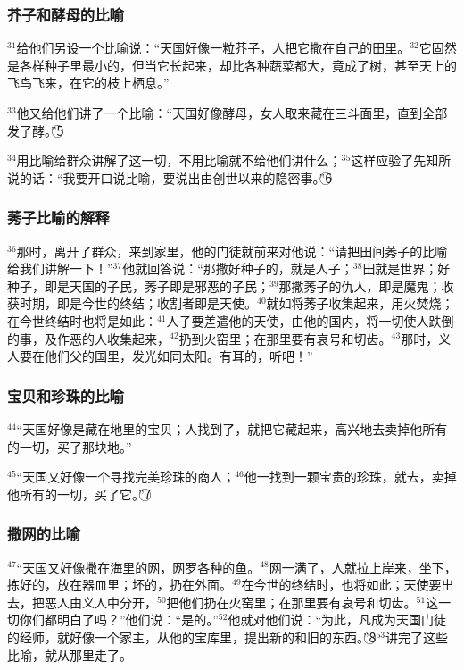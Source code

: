 \subsubsection{芥子和酵母的比喻}
$^{31}$\UL[耶稣]给他们另设一个比喻说：“天国好像一粒芥子，人把它撒在自己的田里。$^{32}$它固然是各样种子里最小的，但当它长起来，却比各种蔬菜都大，竟成了树，甚至天上的飞鸟飞来，在它的枝上栖息。”

$^{33}$他又给他们讲了一个比喻：“天国好像酵母，女人取来藏在三斗面里，直到全部发了酵。”\textcircled{5}

$^{34}$\UL[耶稣]用比喻给群众讲解了这一切，不用比喻就不给他们讲什么；$^{35}$这样应验了先知所说的话：“我要开口说比喻，要说出由创世以来的隐密事。”\textcircled{6}


\subsubsection{莠子比喻的解释}
$^{36}$那时，\UL[耶稣]离开了群众，来到家里，他的门徒就前来对他说：“请把田间莠子的比喻给我们讲解一下！”$^{37}$他就回答说：“那撒好种子的，就是人子；$^{38}$田就是世界；好种子，即是天国的子民，莠子即是邪恶的子民；$^{39}$那撒莠子的仇人，即是魔鬼；收获时期，即是今世的终结；收割者即是天使。$^{40}$就如将莠子收集起来，用火焚烧；在今世终结时也将是如此：$^{41}$人子要差遣他的天使，由他的国内，将一切使人跌倒的事，及作恶的人收集起来，$^{42}$扔到火窑里；在那里要有哀号和切齿。$^{43}$那时，义人要在他们父的国里，发光如同太阳。有耳的，听吧！”


\subsubsection{宝贝和珍珠的比喻}
$^{44}$“天国好像是藏在地里的宝贝；人找到了，就把它藏起来，高兴地去卖掉他所有的一切，买了那块地。”

$^{45}$“天国又好像一个寻找完美珍珠的商人；$^{46}$他一找到一颗宝贵的珍珠，就去，卖掉他所有的一切，买了它。”\textcircled{7}


\subsubsection{撒网的比喻}
$^{47}$“天国又好像撒在海里的网，网罗各种的鱼。$^{48}$网一满了，人就拉上岸来，坐下，拣好的，放在器皿里；坏的，扔在外面。$^{49}$在今世的终结时，也将如此；天使要出去，把恶人由义人中分开，$^{50}$把他们扔在火窑里；在那里要有哀号和切齿。$^{51}$这一切你们都明白了吗？”他们说：“是的。”$^{52}$他就对他们说：“为此，凡成为天国门徒的经师，就好像一个家主，从他的宝库里，提出新的和旧的东西。”\textcircled{8}$^{53}$\UL[耶稣]讲完了这些比喻，就从那里走了。


